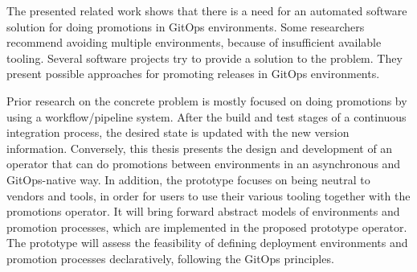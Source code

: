 The presented related work shows that there is a need for an automated software solution
for doing promotions in GitOps environments.
Some researchers recommend avoiding multiple environments,
because of insufficient available tooling.
Several software projects try to provide a solution to the problem.
They present possible approaches for promoting releases in GitOps environments.

Prior research on the concrete problem is mostly focused on
doing promotions by using a workflow/pipeline system.
After the build and test stages of a continuous integration process,
the desired state is updated with the new version information.
%
Conversely, this thesis presents the design and development
of an operator that can do promotions between environments
in an asynchronous and GitOps-native way.
In addition, the prototype focuses on being neutral to vendors
and tools, in order for users to use their various tooling
together with the promotions operator.
It will bring forward
abstract models of environments and promotion processes,
which are implemented in the proposed prototype operator.
The prototype will assess the feasibility of
defining deployment environments and promotion processes declaratively,
following the GitOps principles.






























